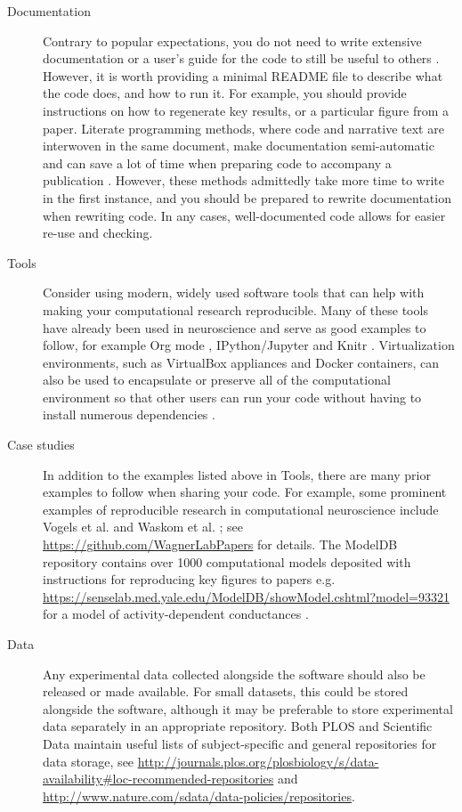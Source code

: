 \documentclass[11pt]{article}
\begin{document}
\begin{description}
\item [Documentation] Contrary to popular expectations, you do not
  need to write extensive documentation or a user's guide for the code
  to still be useful to others \cite{Barnes2010-iv}.  However, it is
  worth providing a minimal README file to describe what the code
  does, and how to run it.  For example, you should provide
  instructions on how to regenerate key results, or a particular
  figure from a paper. Literate programming methods, where code and
  narrative text are interwoven in the same document, make
  documentation semi-automatic and can save a lot of time when
  preparing code to accompany a publication \cite{schulte2012multi,
    gentleman2012statistical}. However, these methods admittedly take
  more time to write in the first instance, and you should be prepared
  to rewrite documentation when rewriting code.  In any cases,
  well-documented code allows for easier re-use and checking.

\item [Tools] Consider using modern, widely used software tools that
  can help with making your computational research reproducible.  Many
  of these tools have already been used in neuroscience and serve as
  good examples to follow, for example Org mode \cite{Delescluse2011},
  IPython/Jupyter \cite{Stevens2013} and Knitr \cite{Eglen2014}.
  Virtualization environments, such as VirtualBox appliances and
  Docker containers, can also be used to encapsulate or preserve all
  of the computational environment so that other users can run your
  code without having to install numerous dependencies
  \cite{Boettiger2015}.


\item [Case studies] In addition to the examples listed above in
  Tools\cite{Delescluse2011,Stevens2013,Eglen2014}, there are many
  prior examples to follow when sharing your code.  For example, some
  prominent examples of reproducible research in computational
  neuroscience include Vogels et al. \cite{Vogels2011-c8c} and Waskom
  et al. \cite{Waskom2014-gd}; see
  \url{https://github.com/WagnerLabPapers} for details.  The ModelDB
  repository contains over 1000 computational models deposited with
  instructions for reproducing key figures to papers
  e.g. \url{https://senselab.med.yale.edu/ModelDB/showModel.cshtml?model=93321}
  for a model of activity-dependent conductances \cite{Liu1998}.



\item [Data] Any experimental data collected alongside the software
  should also be released or made available.  For small datasets, this
  could be stored alongside the software, although it may be
  preferable to store experimental data separately in an appropriate
  repository.  Both PLOS and Scientific Data maintain useful lists of
  subject-specific and general repositories for data storage, see
  \url{http://journals.plos.org/plosbiology/s/data-availability#loc-recommended-repositories}
  and \url{http://www.nature.com/sdata/data-policies/repositories}.
  


\end{description}
\end{document}
